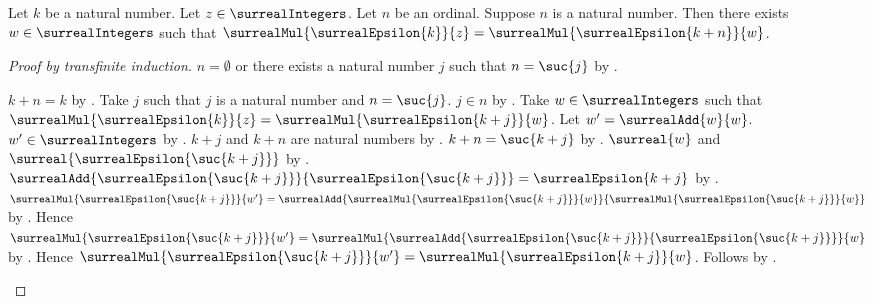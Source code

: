 \begin{theorem}\label{surreal_epsilon_integer_rescale}
    Let $k$ be a natural number.
    Let $z\in\surrealIntegers$.
    Let $n$ be an ordinal.
    Suppose $n$ is a natural number.
    Then there exists $w\in\surrealIntegers$ such that
        $\surrealMul{\surrealEpsilon{k}}{z}
            =\surrealMul{\surrealEpsilon{k+n}}{w}$.
\end{theorem}
\begin{proof}[Proof by transfinite induction]
    $n=\emptyset$ or there exists a natural number $j$ such that
        $n=\suc{j}$ by .
    \begin{byCase}
            $k+n=k$ by .
            Take $j$ such that $j$ is a natural number and
                $n=\suc{j}$.
            $j\in n$ by .
            Take $w\in\surrealIntegers$ such that
                $\surrealMul{\surrealEpsilon{k}}{z}
                    =\surrealMul{\surrealEpsilon{k+j}}{w}$.
            Let $w'=\surrealAdd{w}{w}$.
            $w'\in\surrealIntegers$
                by .
            $k+j$ and $k+n$ are natural numbers
                by .
            $k+n=\suc{k+j}$
                by .
            $\surreal{w}$ and
                $\surreal{\surrealEpsilon{\suc{k+j}}}$
                by .
            $\surrealAdd{\surrealEpsilon{\suc{k+j}}}
                {\surrealEpsilon{\suc{k+j}}}
                =\surrealEpsilon{k+j}$
                by .
            $\surrealMul{\surrealEpsilon{\suc{k+j}}}{w'}
                =\surrealAdd
                    {\surrealMul{\surrealEpsilon{\suc{k+j}}}{w}}
                    {\surrealMul{\surrealEpsilon{\suc{k+j}}}{w}}$
                by .
            Hence
                $\surrealMul{\surrealEpsilon{\suc{k+j}}}{w'}
                =\surrealMul
                    {\surrealAdd{\surrealEpsilon{\suc{k+j}}}
                        {\surrealEpsilon{\suc{k+j}}}}{w}$
                by .
            Hence
                $\surrealMul{\surrealEpsilon{\suc{k+j}}}{w'}
                =\surrealMul{\surrealEpsilon{k+j}}{w}$.
            Follows by \auto.
    \end{byCase}
\end{proof}

